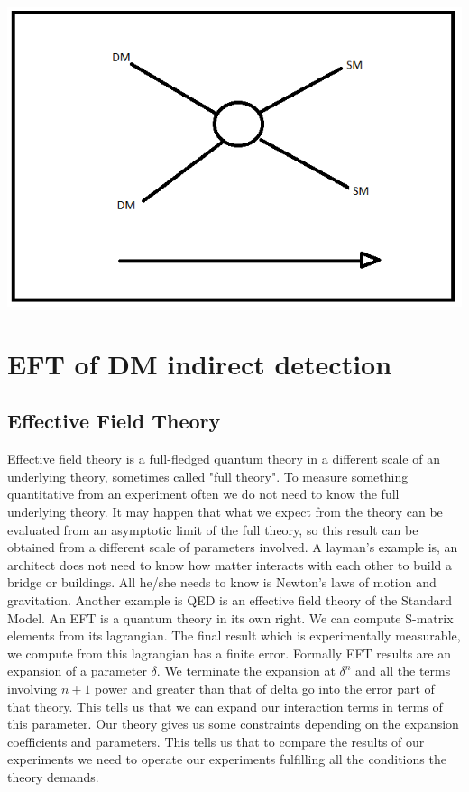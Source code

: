 \documentclass[12pt]{report}
\begin{document}
\begin{center}
\includegraphics[scale=0.3]{indirect_detection1.png}
\end{center}

\newpage

\chapter{EFT of DM indirect detection}

\section{Effective Field Theory}

Effective field theory is a full-fledged quantum theory in a different scale of an underlying theory, sometimes called "full theory". To measure something quantitative from an experiment often we do not need to know the full underlying theory. It may happen that what we expect from the theory can be evaluated from an asymptotic limit of the full theory, so this result can be obtained from a different scale of parameters involved.
A layman's example is, an architect does not need to know how matter interacts with each other to build a bridge or buildings. All he/she needs to know is Newton's laws of motion and gravitation. Another example is QED is an effective field theory of the Standard Model.
An EFT is a quantum theory in its own right. We can compute S-matrix elements from its lagrangian. The final result which is experimentally measurable, we compute from this lagrangian has a finite error. Formally EFT results are an expansion of a parameter $\delta$. We terminate the expansion at $\delta^n$ and all the terms involving $n+1$ power and greater than that of delta go into the error part of that theory. This tells us that we can expand our interaction terms in terms of this parameter. Our theory gives us some constraints depending on the expansion coefficients and parameters. This tells us that to compare the results of our experiments we need to operate our experiments fulfilling all the conditions the theory demands.\\
\end{document}
